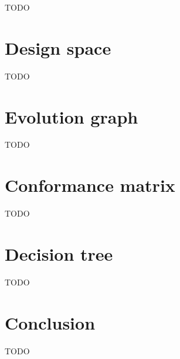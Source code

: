 
TODO 

\section{Design space}
\label{designs}

TODO

\section{Evolution graph}
\label{evolution}

TODO

\section{Conformance matrix}
\label{matrix}

TODO

\section{Decision tree}
\label{tree}

TODO

\section{Conclusion}
\label{conclusion}

TODO




\renewcommand{\addcontentsline}[3]{}%








